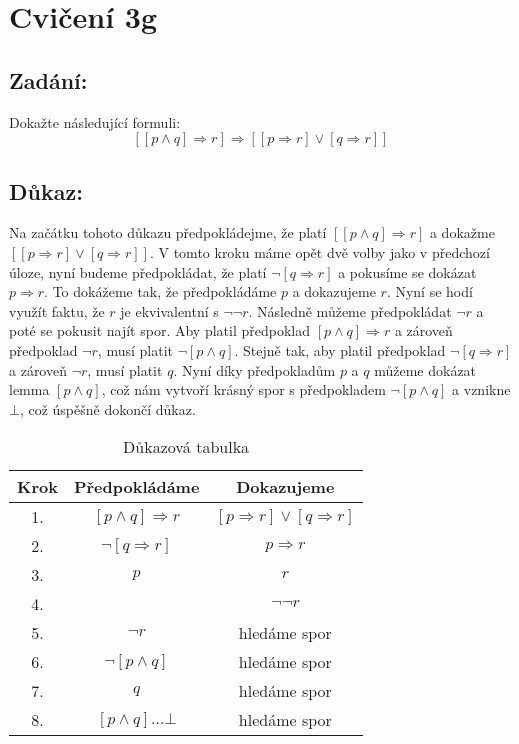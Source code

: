 \documentclass{article}
\begin{document}
\section{Cvičení 3g}

\subsection{Zadání:}

Dokažte následující formuli:
$$[[p \wedge q] \Rightarrow r] \Rightarrow [[p \Rightarrow r] \lor [q \Rightarrow r]]$$

\subsection{Důkaz:}

Na začátku tohoto důkazu předpokládejme, že platí $[[p \wedge q] \Rightarrow r]$ a dokažme $[[p \Rightarrow r] \lor [q \Rightarrow r]]$. V tomto kroku máme opět dvě volby jako v předchozí úloze, nyní budeme předpokládat, že platí $\neg [q \Rightarrow r]$ a pokusíme se dokázat $p \Rightarrow r$. To dokážeme tak, že předpokládáme $p$ a dokazujeme $r$. Nyní se hodí využít faktu, že $r$ je ekvivalentní s $\neg \neg r$. Následně můžeme předpokládat $\neg r$ a poté se pokusit najít spor. Aby platil předpoklad $[p \wedge q] \Rightarrow r$ a zároveň předpoklad $\neg r$, musí platit $\neg [p \wedge q]$. Stejně tak, aby platil předpoklad $\neg [q \Rightarrow r]$ a zároveň $\neg r$, musí platit $q$. Nyní díky předpokladům $p$ a $q$ můžeme dokázat lemma $[p \wedge q]$, což nám vytvoří krásný spor s předpokladem $\neg [p \wedge q]$ a vznikne $\bot$, což úspěšně dokončí důkaz.

\begin{table}[H]\centering

    \caption{Důkazová tabulka}

\begin{tabular}{|c|c|c|}
    
    
        \hline \textbf{Krok} & \textbf{Předpokládáme} & \textbf{Dokazujeme} \\ \hline \hline
    	1. & $[p \wedge q] \Rightarrow r$ & $[p \Rightarrow r] \lor [q \Rightarrow r]$ \\ \hline
    	2. & $\neg [q \Rightarrow r]$ & $p \Rightarrow r$ \\ \hline
    	3. & $p$ & $r$ \\ \hline
    	4. &  & $\neg \neg r$ \\ \hline
    	5. & $\neg r$ & hledáme spor \\ \hline
    	6. & $\neg [p \wedge q]$ & hledáme spor \\ \hline
    	7. & $q$ & hledáme spor \\ \hline
    	8. & $[p \wedge q] \dots \bot$ & hledáme spor \\ \hline
            
    	\end{tabular}
\end{table}
\end{document}
